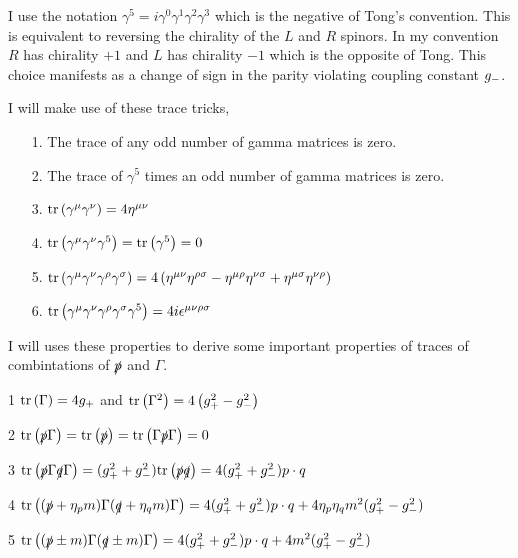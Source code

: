 \documentclass[12pt]{article}
\begin{document}
\begin{remark}
I use the notation $\gamma^5 = i \gamma^0 \gamma^1 \gamma^2 \gamma^3$ which is the negative of Tong's convention. This is equivalent to reversing the chirality of the $L$ and $R$ spinors. In my convention $R$ has chirality $+1$ and $L$ has chirality $-1$ which is the opposite of Tong. This choice manifests as a change of sign in the parity violating coupling constant $g_{-}$.
\end{remark}
\begin{proposition}
I will make use of these trace tricks,
\begin{enumerate}
\item[1.] The trace of any odd number of gamma matrices is zero.

\item[2.] The trace of $\gamma^5$ times an odd number of gamma matrices is zero.

\item[3.] $ \mathrm{tr} \left(  \gamma^\mu \gamma^\nu \right) = 4 \eta^{\mu \nu} $

\item[4.] $ \mathrm{tr} \left(  \gamma^\mu \gamma^\nu \gamma^5  \right) = \mathrm{tr} \left(  \gamma^5  \right) = 0 $

\item[5.] $ \mathrm{tr} \left(  \gamma^\mu \gamma^\nu \gamma^\rho \gamma^\sigma  \right) = 4 \left( \eta^{\mu \nu} \eta^{\rho \sigma} - \eta^{\mu \rho} \eta^{\nu \sigma} + \eta^{\mu \sigma} \eta^{\nu \rho} \right) $  

\item[6.] $ \mathrm{tr} \left(  \gamma^\mu \gamma^\nu \gamma^\rho \gamma^\sigma \gamma^5  \right) = 4 i \epsilon^{\mu \nu \rho \sigma} $
\end{enumerate}
\end{proposition}

I will uses these properties to derive some important properties of traces of combintations of $\slashed{p}$ and $\Gamma$. 

\begin{proposition}

\item[1] $ \mathrm{tr} \left(  \Gamma  \right) = 4 g_{+} $ and $\mathrm{tr} \left(  \Gamma^2  \right) = 4 \left( g_{+}^2 - g_{-}^2 \right)$ 

\item[2] $ \mathrm{tr} \left(  \slashed{p} \Gamma  \right) = \mathrm{tr} \left(  \slashed{p}  \right) = \mathrm{tr} \left(  \Gamma \slashed{p} \Gamma  \right) = 0 $ 

\item[3] $  \mathrm{tr} \left(  \slashed{p} \Gamma \slashed{q} \Gamma  \right) = (g_{+}^2 + g_{-}^2) \mathrm{tr} \left(  \slashed{p} \slashed{q}  \right) = 4 (g_{+}^2 + g_{-}^2) p \cdot q $

\item[4] $\mathrm{tr} \left(  (\slashed{p} + \eta_p m) \Gamma (\slashed{q} + \eta_q m) \Gamma  \right) = 4 ( g_{+}^2 + g_{-}^2) p \cdot q + 4 \eta_p \eta_q m^2 (g_{+}^2 - g_{-}^2) $

\item[5] $\mathrm{tr} \left(  (\slashed{p} \pm m) \Gamma (\slashed{q} \pm m) \Gamma  \right) = 4 ( g_{+}^2 + g_{-}^2) p \cdot q + 4 m^2 (g_{+}^2 - g_{-}^2)$ 
\end{proposition}
\end{document}
